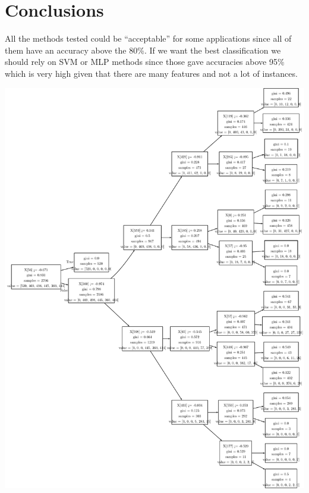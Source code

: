\documentclass[conference,a4paper]{IEEEtran}
\begin{document}
\section{Conclusions}

All the methods tested could be ``acceptable'' for some applications since all of them have an accuracy above the 80\%. If we want the best classification we should rely on SVM or MLP methods since those gave accuracies above 95\% which is very high given that there are many features and not a lot of instances.




\onecolumn
\appendix
\noindent\begin{minipage}{\textwidth}
    \centering
    \includegraphics[width=0.93\linewidth]{decision_tree.pdf}
    \label{fig:dt}
\end{minipage}
\end{document}

